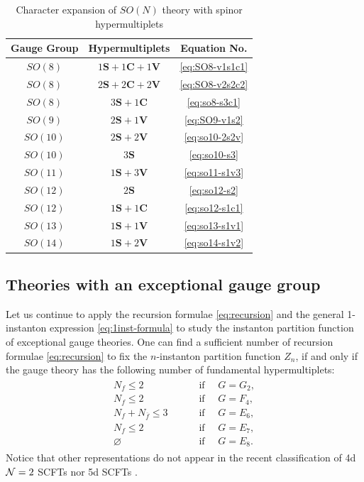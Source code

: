 \documentclass[letterpaper, 11pt]{article}
\def\CN{{\cal N}}
\begin{document}
{\begin{table}[h!]
  \centering
  \begin{tabular}{cc|c}
    \hline
    Gauge Group & Hypermultiplets & Equation No.\\
    \hline\hline
	$SO(8)$ & $1\mathbf{S}+1\mathbf{C}+1\mathbf{V}$ & \eqref{eq:SO8-v1s1c1}\\
	$SO(8)$ & $2\mathbf{S}+2\mathbf{C}+2\mathbf{V}$ & \eqref{eq:SO8-v2s2c2}\\
	$SO(8)$ & $3\mathbf{S}+1\mathbf{C}$ &  \eqref{eq:so8-s3c1}\\
	$SO(9)$ & $2\mathbf{S}+1\mathbf{V}$ & \eqref{eq:SO9-v1s2}\\
	$SO(10)$ & $2\mathbf{S}+2\mathbf{V}$ & \eqref{eq:so10-2s2v}\\
	$SO(10)$ & $3\mathbf{S}$ & \eqref{eq:so10-s3}\\
	$SO(11)$ & $1\mathbf{S}+3\mathbf{V}$ & \eqref{eq:so11-s1v3}\\
	$SO(12)$ & $2\mathbf{S}$ & \eqref{eq:so12-s2}\\
	$SO(12)$ & $1\mathbf{S}+1\mathbf{C}$ & \eqref{eq:so12-s1c1}\\
	$SO(13)$ & $1\mathbf{S}+1\mathbf{V}$ & \eqref{eq:so13-s1v1}\\
	$SO(14)$ & $1\mathbf{S}+2\mathbf{V}$ & \eqref{eq:so14-s1v2}\\\hline
    \end{tabular}
  \caption{Character expansion of $SO(N)$ theory with spinor hypermultiplets}
  \label{tbl:son-data}
\end{table}


\subsection{Theories with an exceptional gauge group}
\label{subsec:exceptional}


Let us continue to apply the recursion formulae \eqref{eq:recursion} and the general 1-instanton expression \eqref{eq:1inst-formula} to study the instanton partition function of exceptional gauge theories. One can find a sufficient number of recursion formulae \eqref{eq:recursion} to fix the $n$-instanton partition function $Z_n$, if and only if the gauge theory has the following number of fundamental hypermultiplets: 
\begin{align}
  \label{eq:exceptional-range}
  \begin{split}
    N_{f} \leq 2 & \qquad\text{ if }\quad G=G_2,\\
    N_{f} \leq 2 & \qquad\text{ if }\quad G=F_4,\\
    N_{f}+N_{\overline{f}} \leq 3 & \qquad\text{ if }\quad G=E_6,\\
    N_{f} \leq 2 & \qquad\text{ if }\quad G=E_7,\\
    \varnothing & \qquad\text{ if }\quad G=E_8.
  \end{split}
\end{align}
Notice that other representations do not appear in the recent classification of 4d $\CN=2$ SCFTs \cite{Bhardwaj:2013qia} nor 5d SCFTs \cite{Jefferson:2017ahm}.

}
\end{document}
